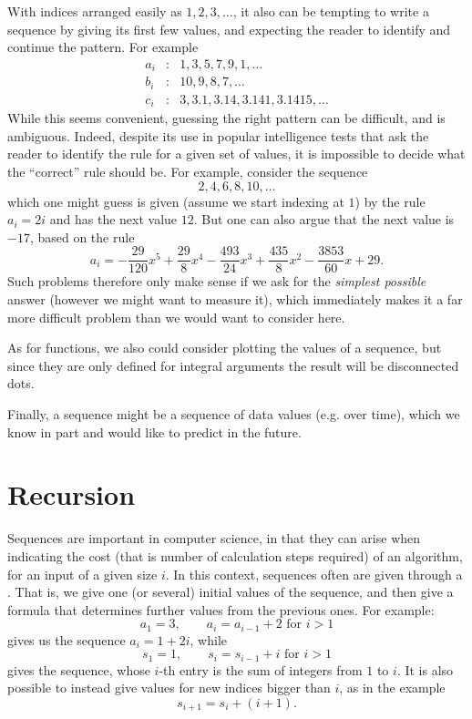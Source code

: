 With indices arranged easily as $1,2,3,\ldots$, it also can be tempting to write a sequence by
giving its first few values, and expecting the reader to identify and continue the
pattern. For example
\begin{eqnarray*}
a_i&:&1,3,5,7,9,1,\ldots\\
b_i&:&10,9,8,7,\ldots\\
c_i&:&3, 3.1, 3.14, 3.141, 3.1415,\ldots
\end{eqnarray*}
While this seems convenient, guessing the right pattern can be difficult, and
is ambiguous. Indeed, despite its use in popular intelligence tests that ask
the reader to identify the rule for a given set of values, it is impossible
to decide what the ``correct'' rule should be. For example, consider the
sequence
\[
2,4,6,8,10,\ldots
\]
which one might guess is given (assume we start indexing at $1$) by the rule $a_i=2i$
and has the next value $12$. But one can also argue that the next value is $-17$, based
on the rule
\[
a_i=-\frac{29}{120}x^{5}+\frac{29}{8}x^{4}-\frac{493}{24}x^{3}+\frac{435}{8}x^{2}
-\frac{3853}{60}x+29.
\]
Such problems therefore only make sense if we ask for the {\em simplest possible} answer
(however we might want to measure it), which immediately makes it a far more difficult
problem than we would want to consider here.
\medskip

As for functions, we also could consider plotting the values of a sequence, but since
they are only defined for integral arguments the result will be disconnected dots.

Finally, a sequence might be a sequence of data values (e.g. over time), which we know
in part and would like to predict in the future.

\section{Recursion}

Sequences are important in computer science, in that they can arise when indicating the
cost (that is number of calculation steps required) of an algorithm, for an input of a
given size $i$. In this context, sequences often are given through a .
That is, we give one (or several) initial values of the sequence, and then give a
formula that determines further values from the previous ones. For example:
\[
a_1=3,\qquad a_i=a_{i-1}+2\mbox{\ for $i>1$}
\]
gives us the sequence $a_i=1+2i$, while
\[
s_1=1,\qquad s_i=s_{i-1}+i\mbox{\ for $i>1$}
\]
gives the sequence, whose $i$-th entry is the sum of integers from $1$ to $i$. It is
also possible to instead give values for new indices bigger than $i$, as in the example
\[
s_{i+1}=s_i+(i+1).
\]

